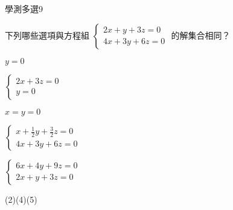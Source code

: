     \begin{QUESTION}
        \begin{ExamInfo}{91}{學測}{多選}{9}
        \end{ExamInfo}
        \begin{ExamAnsRateInfo}{31}{53}{26}{14}
        \end{ExamAnsRateInfo}
        \begin{QBODY}
            下列哪些選項與方程組 $\left\{ \begin{array}{l} 2x+y+3z=0 \\ 4x+3y+6z =0 \end{array}\right.$ 的解集合相同？
            
            \begin{QOPS} 
                \QOP $y=0$ 
                
                \QOP 
                $\left\{ \begin{array}{l} 2x+3z=0 \\y=0 \end{array}\right.$
                
                \QOP
                $x=y=0$
                
                \QOP
                $\left\{ \begin{array}{l} x+\frac{1}{2}y+\frac{3}{2}z=0 \\ 4x+3y+6z =0 \end{array}\right.$
                
                \QOP
                $\left\{ \begin{array}{l} 6x+4y+9z=0 \\ 2x+y+3z =0 \end{array}\right.$
            \end{QOPS}
        \end{QBODY}
        \begin{QFROMS}
        \end{QFROMS}
        \begin{QTAGS}\end{QTAGS}
        \begin{QANS}
            (2)(4)(5)
        \end{QANS}
        \begin{QSOLLIST}
        \end{QSOLLIST}
        \begin{QEMPTYSPACE}
        \end{QEMPTYSPACE}
    \end{QUESTION}
